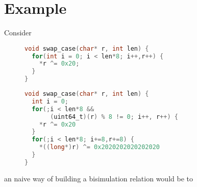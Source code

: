 \section{Example}

Consider

\begin{figure}
\begin{lstlisting}[language=C]
void swap_case(char* r, int len) {
  for(int i = 0; i < len*8; i++,r++) {
    *r ^= 0x20; 
  }
}
\end{lstlisting}
\begin{lstlisting}[language=C]
void swap_case(char* r, int len) {
  int i = 0;
  for(;i < len*8 && 
       (uint64_t)(r) % 8 != 0; i++, r++) {
    *r ^= 0x20 
  }
  for(;i < len*8; i+=8,r+=8) {
    *((long*)r) ^= 0x2020202020202020
  }
}
\end{lstlisting}
\end{figure}


an naive way of building a bisimulation relation would be to 


